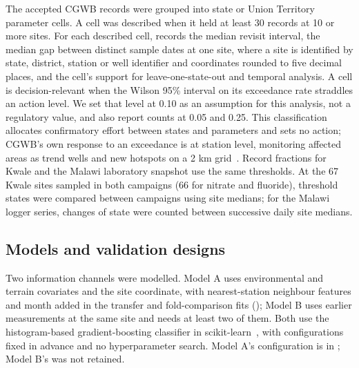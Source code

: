 \documentclass[10pt,letterpaper]{article}
\begin{document}
The accepted CGWB records were grouped into state or Union Territory \texttimes{} parameter cells. A cell was described when it held at least 30 records at 10 or more sites. For each described cell,  records the median revisit interval, the median gap between distinct sample dates at one site, where a site is identified by state, district, station or well identifier and coordinates rounded to five decimal places, and the cell's support for leave-one-state-out and temporal analysis. A cell is decision-relevant when the Wilson 95\% interval on its exceedance rate straddles an action level. We set that level at 0.10 as an assumption for this analysis, not a regulatory value, and also report counts at 0.05 and 0.25. This classification allocates confirmatory effort between states and parameters and sets no action; CGWB's own response to an exceedance is at station level, monitoring affected areas as trend wells and new hotspots on a 2 km grid~\cite{CGWB-SOP-GWQDataAnalysis}. Record fractions for Kwale and the Malawi laboratory snapshot use the same thresholds. At the 67 Kwale sites sampled in both campaigns (66 for nitrate and fluoride), threshold states were compared between campaigns using site medians; for the Malawi logger series, changes of state were counted between successive daily site medians.

\subsection*{Models and validation designs}

Two information channels were modelled. Model A uses environmental and terrain covariates and the site coordinate, with nearest-station neighbour features and month added in the transfer and fold-comparison fits (); Model B uses earlier measurements at the same site and needs at least two of them. Both use the histogram-based gradient-boosting classifier in scikit-learn~\cite{Pedregosa2011}, with configurations fixed in advance and no hyperparameter search. Model A's configuration is in ; Model B's was not retained.
\end{document}
